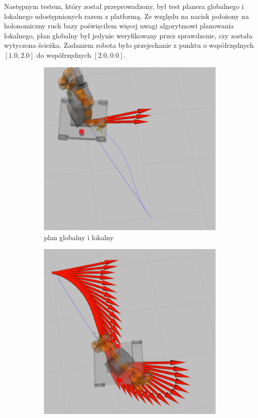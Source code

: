 		Następnym testem, który został przeprowadzony, był test planera globalnego i lokalnego udostępnionych razem z platformą.
		Ze względu na nacisk położony na holonomiczny ruch bazy poświęciłem więcej uwagi algorytmowi planowania lokalnego, plan globalny był jedynie weryfikowany przez sprawdzenie, czy została wytyczona ścieżka.
		Zadaniem robota było przejechanie z punktu o współrzędnych $[1.0 ,2.0]$ do współrzędnych $[2.0, 0.0]$.
		

		\begin{figure}[h!]
 			 \centering
  			\begin{subfigure}[b]{0.4\linewidth}
   				 \includegraphics[width=\linewidth]{imgs/wstepne_badania/plan.png}
    				\caption{plan globalny i lokalny}
  			\end{subfigure}
  			\begin{subfigure}[b]{0.4\linewidth}
    				\includegraphics[width=\linewidth]{imgs/wstepne_badania/path.png}

\end{subfigure}
\end{figure}
